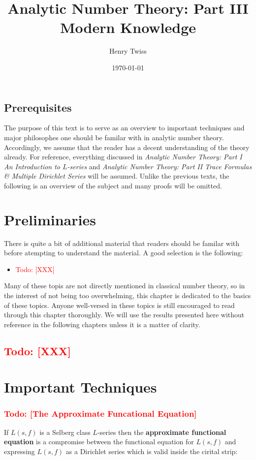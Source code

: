 \documentclass[12pt]{book}
\title{Analytic Number Theory: Part III \\ Modern Knowledge}
\author{Henry Twiss}
\date{\today}
\theoremstyle{definition}\newframedtheorem{method}{Method}
\newcommand{\<}{\langle}
\renewcommand{\>}{\rangle}
\newcommand{\todo}[1]{\textcolor{red}{\sf Todo: [#1]}}
\begin{document}
\maketitle
\thispagestyle{fancy}

\newpage

\section*{Prerequisites}
  The purpose of this text is to serve as an overview to important techniques and major philosophes one should be familar with in analytic number theory. Accordingly, we assume that the reader has a decent understanding of the theory already. For reference, everything discussed in \textit{Analytic Number Theory: Part I An Introduction to $L$-series} and \textit{Analytic Number Theory: Part II Trace Formulas \& Multiple Dirichlet Series} will be assumed. Unlike the previous texts, the following is an overview of the subject and many proofs will be omitted.

\newpage

\tableofcontents

\newpage

\chapter{Preliminaries}
  There is quite a bit of additional material that readers should be familar with before atempting to understand the material. A good selection is the following:
  \begin{itemize}
    \item \todo{XXX}
  \end{itemize}
  Many of these topis are not directly mentioned in classical number theory, so in the interest of not being too overwhelming, this chapter is dedicated to the basics of these topics. Anyone well-versed in these topics is still encouraged to read through this chapter thoroughly. We will use the results presented here without reference in the following chapters unless it is a matter of clarity.
  \section{\todo{XXX}}

  \chapter{Important Techniques}
    \subsection*{\todo{The Approximate Funcational Equation}}
      If $L(s,f)$ is a Selberg class $L$-series then the \textbf{approximate functional equation} is a compromise between the functional equation for $L(s,f)$ and expressing $L(s,f)$ as a Dirichlet series which is valid inside the cirital strip:
\end{document}
